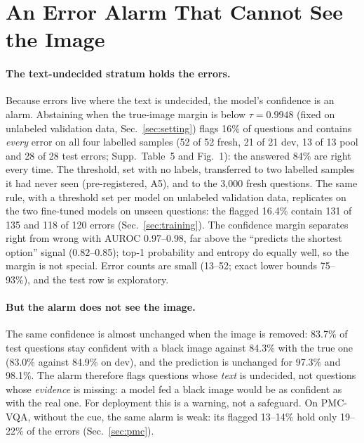 \section{An Error Alarm That Cannot See the Image}
\label{sec:conf}

\paragraph{The text-undecided stratum holds the errors.}
Because errors live where the text is undecided, the model's confidence is an alarm.
Abstaining when the true-image margin is below $\tau=0.9948$ (fixed on unlabeled validation data, Sec.~\ref{sec:setting}) flags 16\% of questions and contains \emph{every} error on all four labelled samples (52 of 52 fresh, 21 of 21 dev, 13 of 13 pool and 28 of 28 test errors; Supp.~Table~5 and Fig.~1): the answered 84\% are right every time.
The threshold, set with no labels, transferred to two labelled samples it had never seen (pre-registered, A5), and to the 3{,}000 fresh questions.
The same rule, with a threshold set per model on unlabeled validation data, replicates on the two fine-tuned models on unseen questions: the flagged 16.4\% contain 131 of 135 and 118 of 120 errors (Sec.~\ref{sec:training}).
The confidence margin separates right from wrong with AUROC 0.97--0.98, far above the ``predicts the shortest option'' signal (0.82--0.85); top-1 probability and entropy do equally well, so the margin is not special.
Error counts are small (13--52; exact lower bounds 75--93\%), and the test row is exploratory.

\paragraph{But the alarm does not see the image.}
The same confidence is almost unchanged when the image is removed: 83.7\% of test questions stay confident with a black image against 84.3\% with the true one (83.0\% against 84.9\% on dev), and the prediction is unchanged for 97.3\% and 98.1\%.
The alarm therefore flags questions whose \emph{text} is undecided, not questions whose \emph{evidence} is missing: a model fed a black image would be as confident as with the real one.
For deployment this is a warning, not a safeguard. On PMC-VQA, without the cue, the same alarm is weak: its flagged 13--14\% hold only 19--22\% of the errors (Sec.~\ref{sec:pmc}).
